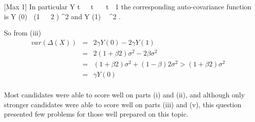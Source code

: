 \documentclass[a4paper,12pt]{article}
\begin{document}
[Max 1]
In particular Y t   t   t  1 the corresponding auto-covariance function is
\gamma Y (0)  (1   2 ) \sigma^{2} and \gamma Y (1)  \sigma^{2} .

So from (iii) 
\begin{eqnarray*}
var(\Delta(X)) &=& 2\gamma Y (0) − 2\gamma Y (1) \\ 
&=& 2(1 + \beta 2 )\sigma^{2} − 2\beta\sigma^{2} \\ 
&=& ( 1 + \beta 2 ) \sigma^{2} + ( 1 − \beta ) 2 \sigma^{2} > ( 1 + \beta 2 ) \sigma^{2} \\ &=& \gamma Y ( 0)\\
\end{eqnarray*}

Most candidates were able to score well on parts (i) and (ii), and
although only stronger candidates were able to score well on parts (iii)
and (v), this question presented few problems for those well prepared
on this topic.
\end{document}
